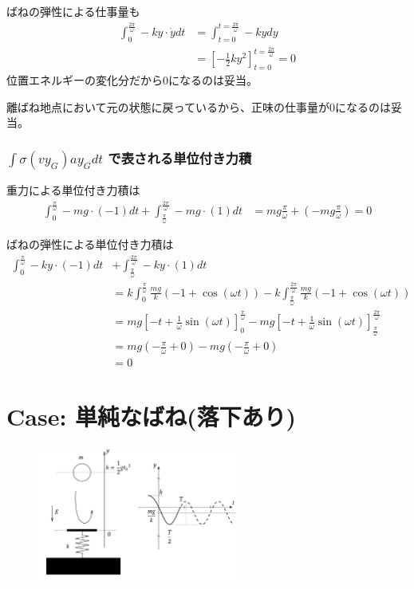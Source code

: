 \documentclass[a4paper,11pt]{jsarticle}
\begin{document}
ばねの弾性による仕事量も
\begin{align}
  \int_0^{\frac{2\pi}{\omega}} -ky \cdot\dot{y} dt
   & = \int_{t=0}^{t=\frac{2\pi}{\omega}} -kydy
  \\&= \left[-\frac{1}{2}ky^2\right]_{t=0}^{t=\frac{2\pi}{\omega}} = 0
\end{align}
位置エネルギーの変化分だから0になるのは妥当。

離ばね地点において元の状態に戻っているから、正味の仕事量が0になるのは妥当。

\subsubsection{$\int\sigma (vy_G)ay_G dt$ で表される単位付き力積}
重力による単位付き力積は
\begin{align}
  \int_0^{\frac{\pi}{\omega}} -mg\cdot(-1) dt + \int_{\frac{\pi}{\omega}}^{\frac{2\pi}{\omega}} -mg\cdot(1) dt
   & = mg\frac{\pi}{\omega} + \left(-mg\frac{\pi}{\omega}\right) = 0
\end{align}

ばねの弾性による単位付き力積は
\begin{align}
  \int_0^{\frac{\pi}{\omega}} -ky\cdot(-1) dt
   & + \int_{\frac{\pi}{\omega}}^{\frac{2\pi}{\omega}} -ky\cdot(1) dt
  \\ &= k \int_0^{\frac{\pi}{\omega}} \frac{mg}{k}\left(-1+\cos(\omega t)\right)
  - k \int_{\frac{\pi}{\omega}}^{\frac{2\pi}{\omega}} \frac{mg}{k}\left(-1+\cos(\omega t)\right)
  \\&= mg \left[-t+\frac{1}{\omega}\sin(\omega t)\right]_0^{\frac{\pi}{\omega}}
  - mg \left[-t+\frac{1}{\omega}\sin(\omega t)\right]_{\frac{\pi}{\omega}}^{\frac{2\pi}{\omega}}
  \\&= mg \left( -\frac{\pi}{\omega} + 0 \right)
  - mg\left( -\frac{\pi}{\omega} + 0 \right)
  \\ &= 0
\end{align}


\section{Case: 単純なばね(落下あり)}
\label{section:simple_string_h}

\begin{figure}[h]
  \centering
  \includegraphics[width = 0.6\textwidth]{fall_and_spring.png}
  \caption{}
  \label{fall_and_spring.png}
\end{figure}
\end{document}
